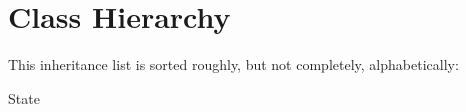 \section{Class Hierarchy}
This inheritance list is sorted roughly, but not completely, alphabetically\+:\begin{DoxyCompactList}
\item State\begin{DoxyCompactList}
\item {}
\item {}
\item {}
\end{DoxyCompactList}
\end{DoxyCompactList}
